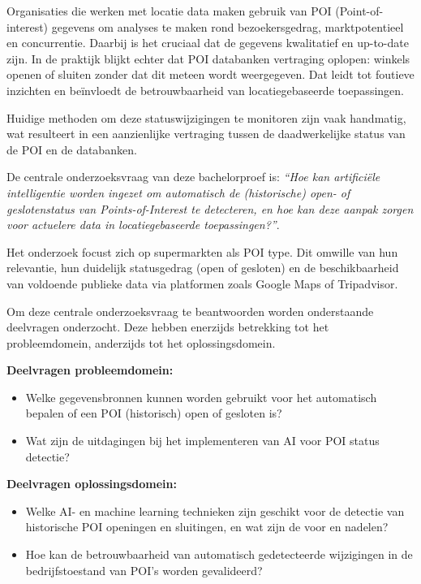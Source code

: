 Organisaties die werken met locatie data maken gebruik van POI (Point-of-interest) gegevens om analyses te maken rond bezoekersgedrag, 
marktpotentieel en concurrentie. Daarbij is het cruciaal dat de gegevens kwalitatief en up-to-date zijn. In de praktijk blijkt echter dat 
POI databanken vertraging oplopen: winkels openen of sluiten zonder dat dit meteen wordt weergegeven. Dat leidt tot foutieve inzichten en 
beïnvloedt de betrouwbaarheid van locatiegebaseerde toepassingen.

Huidige methoden om deze statuswijzigingen te monitoren zijn vaak handmatig, wat resulteert in 
een aanzienlijke vertraging tussen de daadwerkelijke status van de POI en de databanken.

De centrale onderzoeksvraag van deze bachelorproef is: \textit{“Hoe kan artificiële intelligentie worden ingezet om automatisch de 
(historische) open- of geslotenstatus van Points-of-Interest te detecteren, en hoe kan deze aanpak zorgen voor actuelere data in 
locatiegebaseerde toepassingen?”}.

Het onderzoek focust zich op supermarkten als POI type. Dit omwille van hun relevantie, hun duidelijk statusgedrag (open of gesloten) en 
de beschikbaarheid van voldoende publieke data via platformen zoals Google Maps of Tripadvisor. 

Om deze centrale onderzoeksvraag te beantwoorden worden onderstaande deelvragen onderzocht.
Deze hebben enerzijds betrekking tot het probleemdomein, anderzijds tot het oplossingsdomein.

\textbf{Deelvragen probleemdomein:}
\begin{itemize}
  \item Welke gegevensbronnen kunnen worden gebruikt voor het automatisch bepalen of een POI (historisch) open of gesloten is?
  \item Wat zijn de uitdagingen bij het implementeren van AI voor POI status detectie?
\end{itemize}


\textbf{Deelvragen oplossingsdomein:}
\begin{itemize}
    \item Welke AI- en machine learning technieken zijn geschikt voor de detectie van historische POI openingen en sluitingen, en wat zijn de voor en nadelen?
    \item Hoe kan de betrouwbaarheid van automatisch gedetecteerde wijzigingen in de bedrijfstoestand van POI’s worden gevalideerd?
\end{itemize}

